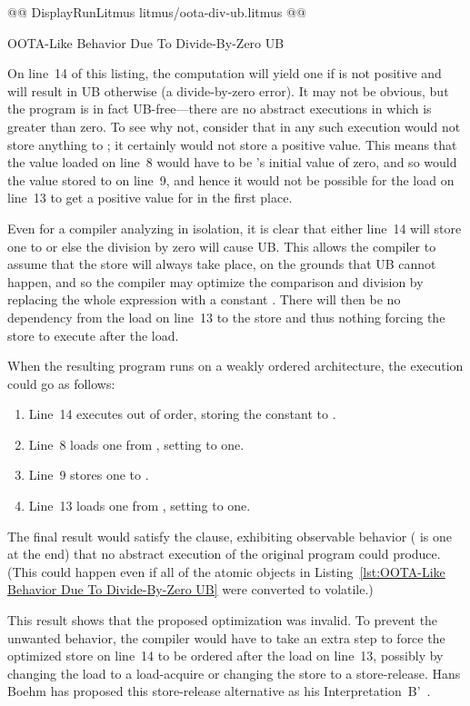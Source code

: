 \documentclass[10]{article}
\begin{document}
\begin{listing}[tbp]
@@ DisplayRunLitmus litmus/oota-div-ub.litmus @@
\caption{OOTA-Like Behavior Due To Divide-By-Zero UB}
\label{lst:OOTA-Like Behavior Due To Divide-By-Zero UB}
\end{listing}

On line~14 of this listing, the computation 
will yield one if  is not positive and will result in UB
otherwise (a divide-by-zero error).
It may not be obvious, but the program is in fact UB-free---there are
no abstract executions in which  is greater than zero.
To see why not, consider that in any such execution
 would not store anything to ;
it certainly would not store a positive value.
This means that the value loaded on line~8 would have to be 's
initial value of zero, and so would the value stored to  on
line~9, and hence it would not be possible for the load on line~13
to get a positive value for  in the first place.

Even for a compiler analyzing  in isolation,
it is clear that either line~14 will store one to  or
else the division by zero will cause UB.
This allows the compiler to assume that the store will always
take place, on the grounds that UB cannot happen,
and so the compiler may optimize the comparison and division
by replacing the whole expression with a constant .
There will then be no dependency from the load on line~13
to the store and thus nothing forcing the store to execute
after the load.

When the resulting program runs on a weakly ordered architecture,
the execution could go as follows:
\begin{enumerate}
\item	Line~14 executes out of order, storing the constant  to .
\item	Line~8 loads one from , setting  to one.
\item	Line~9 stores one to .
\item	Line~13 loads one from , setting  to one.
\end{enumerate}
The final result would satisfy the  clause,
exhibiting observable behavior ( is one at the end)
that no abstract execution of the original program could produce.
(This could happen even if all of the atomic objects in
Listing~\ref{lst:OOTA-Like Behavior Due To Divide-By-Zero UB}
were converted to volatile.)

This result shows that the proposed optimization was invalid.
To prevent the unwanted behavior, the compiler would have to take an
extra step to force the optimized store on line~14 to be ordered after
the load on line~13, possibly by changing the load to a load-acquire
or changing the store to a store-release.
Hans Boehm has proposed this store-release alternative as his
Interpretation~B'~\cite{HansBoehm2020UBalternatives}.
\end{document}
